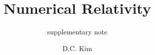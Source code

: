 \documentclass[graybox,envcountchap,sectrefs]{style/svmono}
\begin{document}
\author{D.C. Kim}
\title{Numerical Relativity}
\subtitle{supplementary note}
\maketitle

\frontmatter%

%
%
%
%

\tableofcontents

%


\mainmatter%
%

%
%

\backmatter%
%
%
\printindex

\end{document}
